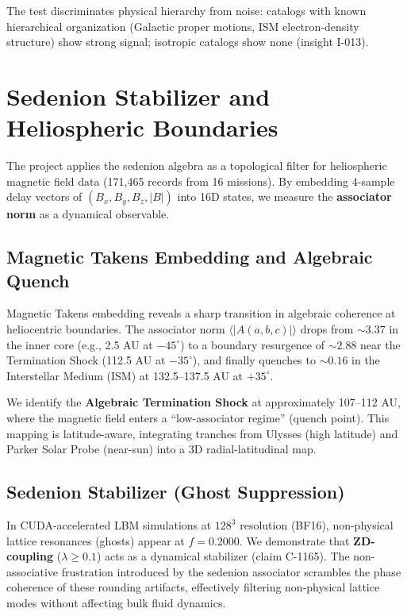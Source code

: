 \documentclass{article}
\theoremstyle{definition}
\theoremstyle{plain}
\theoremstyle{remark}
\begin{document}
The test discriminates physical hierarchy from noise: catalogs with known
hierarchical organization (Galactic proper motions, ISM electron-density
structure) show strong signal; isotropic catalogs show none (insight I-013).

\section{Sedenion Stabilizer and Heliospheric Boundaries}
\label{sec:stabilizer}

The project applies the sedenion algebra as a topological filter for heliospheric
magnetic field data (171,465 records from 16 missions).  By embedding 4-sample
delay vectors of $(B_x, B_y, B_z, |B|)$ into 16D states, we measure the
\textbf{associator norm} as a dynamical observable.

\subsection{Magnetic Takens Embedding and Algebraic Quench}

Magnetic Takens embedding reveals a sharp transition in algebraic coherence
at heliocentric boundaries.  The associator norm $\langle |A(a,b,c)| \rangle$
drops from $\sim 3.37$ in the inner core (e.g., 2.5 AU at $-45^\circ$) to a 
boundary resurgence of $\sim 2.88$ near the Termination Shock (112.5 AU at $-35^\circ$),
and finally quenches to $\sim 0.16$ in the Interstellar Medium (ISM) at 132.5--137.5 AU 
at $+35^\circ$.

We identify the \textbf{Algebraic Termination Shock} at approximately 107--112 AU,
where the magnetic field enters a ``low-associator regime'' (quench point).
This mapping is latitude-aware, integrating tranches from Ulysses (high latitude)
and Parker Solar Probe (near-sun) into a 3D radial-latitudinal map.

\subsection{Sedenion Stabilizer (Ghost Suppression)}

In CUDA-accelerated LBM simulations at $128^3$ resolution (BF16), non-physical
lattice resonances (ghosts) appear at $f=0.2000$.  We demonstrate that
\textbf{ZD-coupling} ($\lambda \ge 0.1$) acts as a dynamical stabilizer
(claim C-1165).  The non-associative frustration introduced by the sedenion
associator scrambles the phase coherence of these rounding artifacts,
effectively filtering non-physical lattice modes without affecting bulk
fluid dynamics.
\end{document}

